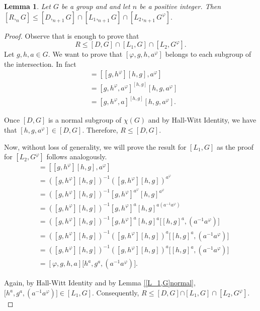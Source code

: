 \documentclass[12pt,leqno]{amsart}
\newtheorem{lem}[theorem]{\sc Lemma}
\begin{document}
\begin{lem}\label{RnaIntersessao}
    Let $G$ be a group and and let $n$ be a positive integer. Then 
    $[R,_nG]\leq [D,_{n+1}G] \cap [L_1,_{n+1}G] \cap [L_2,_{n+1}G^{\varphi}].$
\end{lem}
\begin{proof}
    Observe that is enough to prove that 
    \[
    R\leq [D,G]\cap [L_1,G]\cap [L_2,G^{\varphi}].
    \]
    Let $g,h,a\in G$. We want to prove that $[\varphi,g,h,a^{\varphi}]$ belongs to each subgroup of the intersection. In fact 
    \begin{align*}
       [\varphi,g,h,a^{\varphi}] &= [[g,h^{\varphi}][h,g],a^{\varphi}]\\
       &= [g,h^{\varphi},a^{\varphi}]^{[h,g]}[h,g,a^{\varphi}]\\
       &= [g,h^{\varphi},a]^{[h,g]}[h,g,a^{\varphi}].
    \end{align*}
    
Once $[D,G]$ is a normal subgroup of $\chi(G)$ and by Hall-Witt Identity, we have that $[h,g,a^{\varphi}]\in [D,G]$. Therefore, $R\leq [D,G]$. 

Now, without loss of generality, we will prove the result for $[L_1,G]$ as the proof for $[L_2,G^{\varphi}]$ follows analogously. 
 \begin{align*}
       [\varphi,g,h,a^{\varphi}] &= [[g,h^{\varphi}][h,g],a^{\varphi}]\\
       &= ([g,h^{\varphi}][h,g])^{-1} ([g,h^{\varphi}][h,g])^{a^{\varphi}}\\
       &= ([g,h^{\varphi}][h,g])^{-1} [g,h^{\varphi}]^{a^{\varphi}}[h,g]^{a^{\varphi}}\\
       &= ([g,h^{\varphi}][h,g])^{-1} [g,h^{\varphi}]^{a}[h,g]^{a(a^{-1}a^{\varphi})}\\
       &= ([g,h^{\varphi}][h,g])^{-1} [g,h^{\varphi}]^{a}[h,g]^a\big[[h,g]^a,(a^{-1}a^{\varphi})\big]\\
       &= ([g,h^{\varphi}][h,g])^{-1} ([g,h^{\varphi}][h,g])^a\big[[h,g]^a,(a^{-1}a^{\varphi})\big]\\
       &= ([g,h^{\varphi}][h,g])^{-1} ([g,h^{\varphi}][h,g])^a\big[[h,g]^a,(a^{-1}a^{\varphi})\big]\\
       &=[\varphi,g,h,a] \big[h^a,g^a,(a^{-1}a^{\varphi})\big].
    \end{align*}

Again, by Hall-Witt Identity and by Lemma \ref{[L_1,G]normal}, $\big[h^a,g^a,(a^{-1}a^{\varphi})\big]\in [L_1,G]$. Consequently, $R\leq [D,G]{\cap [L_1,G]\cap [L_2,G^{\varphi}]}.$
\end{proof}
\end{document}
